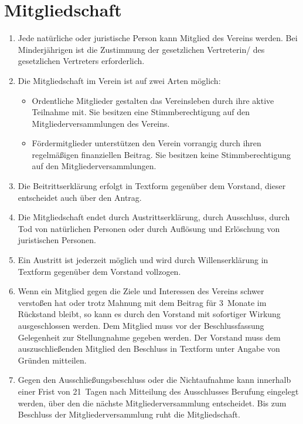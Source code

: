 \documentclass[a4paper,12pt]{scrartcl}
\begin{document}
\section{Mitgliedschaft}
\begin{enumerate}
  \item Jede natürliche oder juristische Person kann Mitglied des Vereins
    werden. Bei Minderjährigen ist die Zustimmung der gesetzlichen Vertreterin/
    des gesetzlichen Vertreters erforderlich.
  \item Die Mitgliedschaft im Verein ist auf zwei Arten möglich:
    \begin{itemize}
      \item Ordentliche Mitglieder gestalten das Vereinsleben durch ihre aktive
        Teilnahme mit. Sie besitzen eine Stimmberechtigung auf den
        Mitgliederversammlungen des Vereins.
      \item Fördermitglieder unterstützen den Verein vorrangig durch ihren
        regelmäßigen finanziellen Beitrag. Sie besitzen keine Stimmberechtigung
        auf den Mitgliederversammlungen.
    \end{itemize}
  \item Die Beitrittserklärung erfolgt in Textform gegenüber dem Vorstand,
    dieser entscheidet auch über den Antrag.
  \item Die Mitgliedschaft endet durch Austrittserklärung, durch Ausschluss,
    durch Tod von natürlichen Personen oder durch Auflösung und Erlöschung von
    juristischen Personen.
  \item Ein Austritt ist jederzeit möglich und wird durch Willenserklärung in
    Textform gegenüber dem Vorstand vollzogen.
  \item Wenn ein Mitglied gegen die Ziele und Interessen des Vereins schwer
    verstoßen hat oder trotz Mahnung mit dem Beitrag für 3~Monate im Rückstand
    bleibt, so kann es durch den Vorstand mit sofortiger Wirkung ausgeschlossen
    werden. Dem Mitglied muss vor der Beschlussfassung Gelegenheit zur
    Stellungnahme gegeben werden. Der Vorstand muss dem auszuschließenden
    Mitglied den Beschluss in Textform unter Angabe von Gründen mitteilen. 
  \item Gegen den Ausschließungsbeschluss oder die Nichtaufnahme kann innerhalb 
    einer Frist von 21~Tagen nach Mitteilung des Ausschlusses Berufung eingelegt
    werden, über den die nächste Mitgliederversammlung entscheidet. Bis zum 
    Beschluss der Mitgliederversammlung ruht die Mitgliedschaft.
\end{enumerate}
\end{document}
